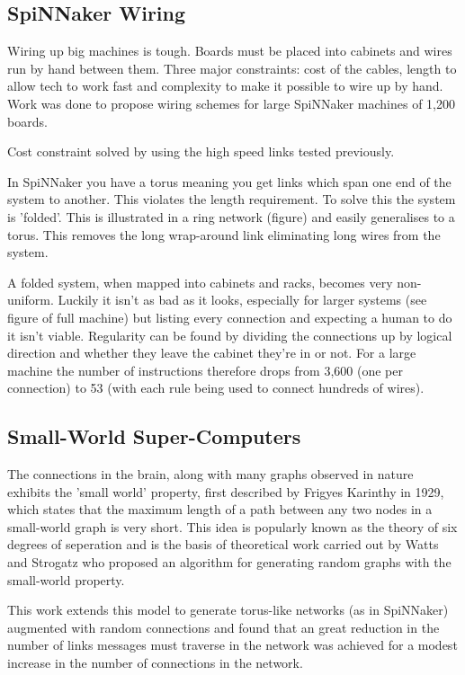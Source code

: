 \subsection{SpiNNaker Wiring}

Wiring up big machines is tough. Boards must be placed into cabinets and wires
run by hand between them. Three major constraints: cost of the cables, length to
allow tech to work fast and complexity to make it possible to wire up by hand.
Work was done to propose wiring schemes for large SpiNNaker machines of 1,200
boards.

Cost constraint solved by using the high speed links tested previously.

In SpiNNaker you have a torus meaning you get links which span one end of the
system to another. This violates the length requirement. To solve this the
system is 'folded'. This is illustrated in a ring network (figure) and easily
generalises to a torus. This removes the long wrap-around link eliminating long
wires from the system.

A folded system, when mapped into cabinets and racks, becomes very non-uniform.
Luckily it isn't as bad as it looks, especially for larger systems (see figure
of full machine) but listing every connection and expecting a human to do it
isn't viable. Regularity can be found by dividing the connections up by logical
direction and whether they leave the cabinet they're in or not. For a large
machine the number of instructions therefore drops from 3,600 (one per
connection) to 53 (with each rule being used to connect hundreds of wires).

\subsection{Small-World Super-Computers}

The connections in the brain, along with many graphs observed in nature exhibits
the 'small world' property, first described by Frigyes Karinthy in 1929, which
states that the maximum length of a path between any two nodes in a small-world
graph is very short. This idea is popularly known as the theory of six degrees
of seperation and is the basis of theoretical work carried out by Watts and
Strogatz who proposed an algorithm for generating random graphs with the
small-world property.

This work extends this model to generate torus-like networks (as in SpiNNaker)
augmented with random connections and found that an great reduction in the
number of links messages must traverse in the network was achieved for a modest
increase in the number of connections in the network.

